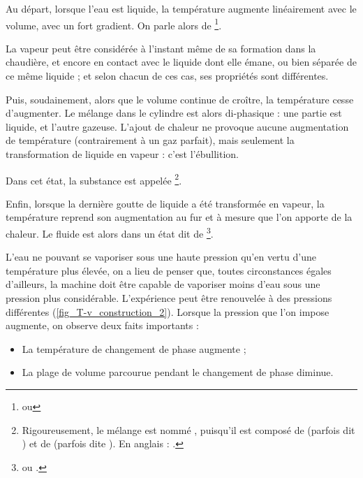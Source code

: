 		Au départ, lorsque l’eau est liquide, la température augmente linéairement avec le volume, avec un fort gradient. On parle alors de \footnote{ ou }. %

		La vapeur peut être considérée à l’instant même de sa formation dans la chaudière, et encore en contact avec le liquide dont elle émane, ou bien séparée de ce même liquide ; et selon chacun de ces cas, ses propriétés sont différentes.

		Puis, soudainement, alors que le volume continue de croître, la température cesse d’augmenter. Le mélange dans le cylindre est alors di-phasique : une partie est liquide, et l’autre gazeuse. L’ajout de chaleur ne provoque aucune augmentation de température (contrairement à un gaz parfait), mais seulement la transformation de liquide en vapeur : c’est l’ébullition. 

		Dans cet état, la substance est appelée \footnote{Rigoureusement, le mélange est nommé , puisqu’il est composé de  (parfois dit ) et de  (parfois dite ). En anglais : .}\nolinebreak.

		Enfin, lorsque la dernière goutte de liquide a été transformée en vapeur, la température reprend son augmentation au fur et à mesure que l’on apporte de la chaleur. Le fluide est alors dans un état dit de \footnote{ ou .}\nolinebreak.%

		\clearfloats %
		L’eau ne pouvant se vaporiser sous une haute pression qu’en vertu d’une température plus élevée, on a lieu de penser que, toutes circonstances égales d’ailleurs, la machine doit être capable de vaporiser moins d’eau sous une pression plus considérable.
		L’expérience peut être renouvelée à des pressions différentes (\cref{fig_T-v_construction_2}). Lorsque la pression que l’on impose augmente, on observe deux faits importants :
		\begin{itemize}
			\item La température de changement de phase augmente ;
			\item La plage de volume parcourue pendant le changement de phase diminue.
		\end{itemize}

